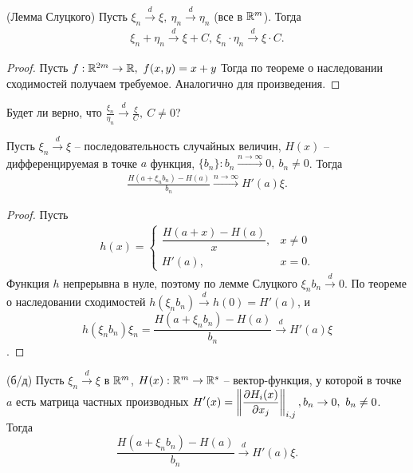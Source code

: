\begin{corollary}
	(Лемма Слуцкого) Пусть $\xi_n \xrightarrow{d} \xi,\ \eta_n \xrightarrow{d} \eta_n$ (все в $\mathbb{R}^m$). Тогда 
	\begin{gather*}
	    \xi_n+\eta_n \xrightarrow{d} \xi + C,\ \xi_n\cdot\eta_n \xrightarrow{d} \xi \cdot C.
	\end{gather*}
\end{corollary}

\begin{proof}
	Пусть $f:\mathbb{R}^{2m}\rightarrow \mathbb{R},\ f(x, y) = x + y$ Тогда по теореме о наследовании сходимостей получаем требуемое. Аналогично для произведения.
\end{proof}

\begin{exercise}
	Будет ли верно, что $\displaystyle \frac{\xi_n}{\eta_n} \xrightarrow{d} \frac{\xi}{C},\ C \ne 0$?
\end{exercise}

\begin{example}
	Пусть $\xi_n \xrightarrow{d} \xi$ -- последовательность случайных величин, $H(x)$ -- дифференцируемая в точке $a$ функция, $\{b_n\}: b_n \xrightarrow{n\rightarrow \infty} 0,\ b_n \ne 0$. Тогда
	\begin{gather*}
	    \frac{H\left(a + \xi_nb_n\right) - H(a)}{b_n}\xrightarrow{n \rightarrow \infty} H'(a)\xi.
	\end{gather*}
\end{example}

\begin{proof}
	Пусть
	\begin{gather*}
	    h( x) =\begin{cases}
		\dfrac{H( a+x) -H( a)}{x}, & x\neq 0\\
		H'( a), & x=0.
	\end{cases}
	\end{gather*}
    Функция $h$ непрерывна в нуле, поэтому по лемме Слуцкого $\xi_nb_n \xrightarrow{d} 0$. По теореме о наследовании сходимостей $\displaystyle h\left(\xi_nb_n\right) \xrightarrow{d} h\left(0\right) = H'(a)$, и
	\begin{equation*}
		h\left(\xi_nb_n\right)\xi_n = \frac{H(a + \xi_nb_n) - H(a)}{b_n} \xrightarrow{d} H'(a)\xi
	\end{equation*}.
\end{proof}

\begin{proposition}
	(б/д) Пусть $\xi_n \xrightarrow{d} \xi$ в $\mathbb{R}^m$, $H(x):\mathbb{R}^m \rightarrow \mathbb{R}^s$ -- вектор-функция, у которой в точке $a$ есть матрица частных производных $\displaystyle H'(x) = \left\Vert\frac{\partial H_i(x)}{\partial x_j}\right\Vert_{i,j},\\ b_n\rightarrow 0,\ b_n \ne 0$. Тогда
	\begin{equation*}
		\frac{H(a + \xi_nb_n) - H(a)}{b_n} \xrightarrow{d} H'(a)\xi.
	\end{equation*}
\end{proposition}
